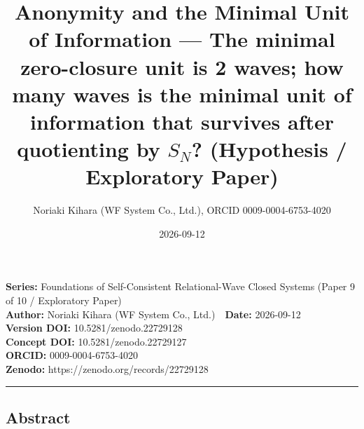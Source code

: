 \documentclass[
  a4paper,
]{ltjsarticle}
\title{Anonymity and the Minimal Unit of Information --- The minimal
zero-closure unit is 2 waves; how many waves is the minimal unit of
information that survives after quotienting by \(S_N\)? (Hypothesis /
Exploratory Paper)}
\author{Noriaki Kihara (WF System Co., Ltd.), ORCID 0009-0004-6753-4020}
\date{2026-09-12}
\begin{document}
\maketitle

\textbf{Series:} Foundations of Self-Consistent Relational-Wave Closed
Systems (Paper 9 of 10 / Exploratory Paper)\\
\textbf{Author:} Noriaki Kihara (WF System Co., Ltd.)　\textbf{Date:}
2026-09-12\\
\textbf{Version DOI:} 10.5281/zenodo.22729128\\
\textbf{Concept DOI:} 10.5281/zenodo.22729127\\
\textbf{ORCID:} 0009-0004-6753-4020\\
\textbf{Zenodo:} https://zenodo.org/records/22729128\\

\begin{center}\rule{0.5\linewidth}{0.5pt}\end{center}

\subsection{Abstract}\label{abstract}
\end{document}
